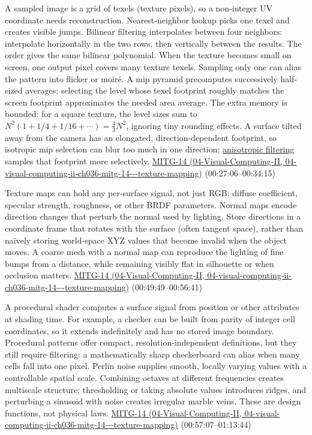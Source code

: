 A sampled image is a grid of texels (texture pixels), so a non-integer UV coordinate needs reconstruction. Nearest-neighbor lookup picks one texel and creates visible jumps. Bilinear filtering interpolates between four neighbors: interpolate horizontally in the two rows, then vertically between the results. The order gives the same bilinear polynomial. When the texture becomes small on screen, one output pixel covers many texture texels. Sampling only one can alias the pattern into flicker or moiré. A mip pyramid precomputes successively half-sized averages; selecting the level whose texel footprint roughly matches the screen footprint approximates the needed area average. The extra memory is bounded: for a square texture, the level sizes sum to \(N^2(1+1/4+1/16+\cdots)=\frac43N^2\), ignoring tiny rounding effects. A surface tilted away from the camera has an elongated, direction-dependent footprint, so isotropic mip selection can blur too much in one direction; \hyperref[appendix-d5b3c692d9f0]{anisotropic filtering} samples that footprint more selectively. \href{../04-Visual-Computing-II/main.pdf\#nameddest=04-visual-computing-ii-ch036-mitg-14---texture-mapping}{MITG-14 (04-Visual-Computing-II, 04-visual-computing-ii-ch036-mitg-14-\/-\/-texture-mapping)} (00:27:06--00:34:15)

Texture maps can hold any per-surface signal, not just RGB: diffuse coefficient, specular strength, roughness, or other BRDF parameters. Normal maps encode direction changes that perturb the normal used by lighting. Store directions in a coordinate frame that rotates with the surface (often tangent space), rather than naïvely storing world-space XYZ values that become invalid when the object moves. A coarse mesh with a normal map can reproduce the lighting of fine bumps from a distance, while remaining visibly flat in silhouette or when occlusion matters. \href{../04-Visual-Computing-II/main.pdf\#nameddest=04-visual-computing-ii-ch036-mitg-14---texture-mapping}{MITG-14 (04-Visual-Computing-II, 04-visual-computing-ii-ch036-mitg-14-\/-\/-texture-mapping)} (00:49:49--00:56:41)

A procedural shader computes a surface signal from position or other attributes at shading time. For example, a checker can be built from parity of integer cell coordinates, so it extends indefinitely and has no stored image boundary. Procedural patterns offer compact, resolution-independent definitions, but they still require filtering: a mathematically sharp checkerboard can alias when many cells fall into one pixel. Perlin noise supplies smooth, locally varying values with a controllable spatial scale. Combining octaves at different frequencies creates multiscale structure; thresholding or taking absolute values introduces ridges, and perturbing a sinusoid with noise creates irregular marble veins. These are design functions, not physical laws. \href{../04-Visual-Computing-II/main.pdf\#nameddest=04-visual-computing-ii-ch036-mitg-14---texture-mapping}{MITG-14 (04-Visual-Computing-II, 04-visual-computing-ii-ch036-mitg-14-\/-\/-texture-mapping)} (00:57:07--01:13:44)

